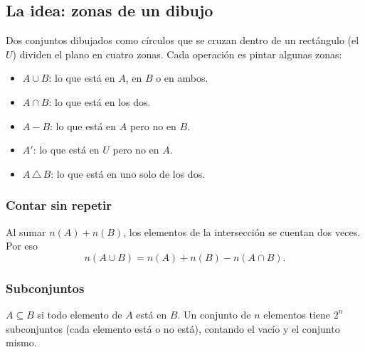 

\subsection{La idea: zonas de un dibujo}
Dos conjuntos dibujados como círculos que se cruzan dentro de un rectángulo (el  $U$) dividen el plano
en cuatro zonas. Cada operación es pintar algunas zonas:


\begin{itemize}
  \item {} $A \cup B$: lo que está en $A$, en $B$ o en ambos.
  \item {} $A \cap B$: lo que está en los dos.
  \item {} $A - B$: lo que está en $A$ pero no en $B$.
  \item {} $A'$: lo que está en $U$ pero no en $A$.
  \item {} $A \,\triangle\, B$: lo que está en uno solo de los dos.
\end{itemize}

\subsubsection{Contar sin repetir}
Al sumar $n(A) + n(B)$, los elementos de la intersección se cuentan dos veces. Por eso
\[n(A \cup B) = n(A) + n(B) - n(A \cap B).\]

\subsubsection{Subconjuntos}
$A \subseteq B$ si todo elemento de $A$ está en $B$. Un conjunto de $n$ elementos tiene $2^n$ subconjuntos (cada
elemento está o no está), contando el vacío y el conjunto mismo.

